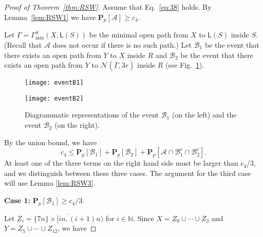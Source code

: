 \documentclass[12pt, twoside,a4paper,reqno]{amsart}
\theoremstyle{plain}
\theoremstyle{remark}
\theoremstyle{definition}
\newcommand{\PP}{\mathbf{P}}
\newcommand{\Pp}[1]{\PP_p \left [ #1 \right ]}
\newcommand{\cal}{\mathcal}
\newcommand{\ol}{\overline}
\begin{document}
\begin{proof}[Proof of Theorem~\ref{thm:RSW}]
  Assume that Eq.~\eqref{eq:38} holds. By Lemma~\ref{lem:RSW1} we have
  $\Pp{\mathcal A}\ge c_4$.

  Let $\Gamma=\Gamma^S_{\mathrm{min}}(X,\mathsf L(S))$ be the minimal open path
  from $X$ to $\mathsf L(S)$ inside $S$. (Recall that $\mathcal{A}$ does not occur if
  there is no such path.) Let $\mathcal B_1$ be the event that there exists an
  open path from $Y$ to $X$ inside $R$ and $\mathcal B_2$ be the event that
  there exists an open path from $Y$ to $\mathcal N(\ol \Gamma,3r)$ inside $R$ (see Fig.~\ref{fig:3}).
  \begin{figure}[htbp]
  \hfill
  \begin{minipage}{.43\linewidth}
    \centering
    \texttt{[image: eventB1]}
  \end{minipage}
  \hfill
  \begin{minipage}{.43\linewidth}
    \centering
    \texttt{[image: eventB2]}
  \end{minipage}
  \hfill
   \caption{Diagrammatic representations of the event $\mathcal
     B_1$ (on the left) and the event $\mathcal B_2$ (on the right).}
    \label{fig:3}
\end{figure}

 By the union bound, we have
    \begin{equation}
      \label{eq:1}
      c_4\le \Pp{\cal B_1}+ \Pp{\cal B_2} +\Pp{\cal A\cap \cal B_1^c \cap\cal B_2^c}.
    \end{equation}
    At least one of the three terms on the right hand side must be larger than
    $c_4/3$, and we distinguish  between these three cases. The argument for the third case will use Lemma \ref{lem:RSW3}.

 \textbf{Case 1:}  $\Pp{\cal B_1}\ge c_4/3$.

      Let $Z_i=\ol{\{7n\}\times[in,(i+1)n)}$ for $i\in \mathbb N$. Since
      $X=Z_0\cup\cdots\cup Z_3$ and $Y=Z_5\cup\cdots\cup Z_{12}$, we have


\end{proof}
\end{document}
